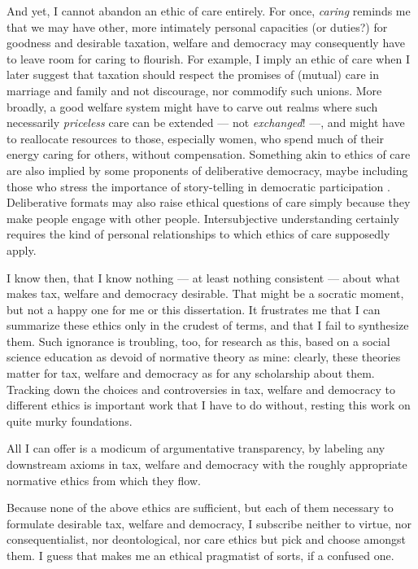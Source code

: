 \begin{description}
	And yet, I cannot abandon an ethic of care entirely. 
	For once, \emph{caring} reminds me that we may have other, more intimately personal capacities (or duties?) for goodness and desirable taxation, welfare and democracy may consequently have to leave room for caring to flourish. 
	For example, I imply an ethic of care when I later suggest that taxation should respect the promises of (mutual) care in marriage and family and not discourage, nor commodify such unions. %
	More broadly, a good welfare system might have to carve out realms where such necessarily \emph{priceless} care can be extended --- not \emph{exchanged}! ---, and might have to reallocate resources to those, especially women, who spend much of their energy caring for others, without compensation. 
	Something akin to ethics of care are also implied by some proponents of deliberative democracy, maybe including those who stress the importance of story-telling in democratic participation \citep{Poletta2006}. 
	Deliberative formats may also raise ethical questions of care simply because they make people engage with other people. Intersubjective understanding certainly requires the kind of personal relationships to which ethics of care supposedly apply.
\end{description}

I know then, that I know nothing --- at least nothing consistent --- about what makes tax, welfare and democracy desirable. 
That might be a socratic moment, but not a happy one for me or this dissertation. 
It frustrates me that I can summarize these ethics only in the crudest of terms, and that I fail to synthesize them. 
Such ignorance is troubling, too, for research as this, based on a social science education as devoid of normative theory as mine: clearly, these theories matter for tax, welfare and democracy as for any scholarship about them. 
Tracking down the choices and controversies in tax, welfare and democracy to different ethics is important work that I have to do without, resting this work on quite murky foundations.

All I can offer is a modicum of argumentative transparency, by labeling any downstream axioms in tax, welfare and democracy with the roughly appropriate normative ethics from which they flow.

Because none of the above ethics are sufficient, but each of them necessary to formulate desirable tax, welfare and democracy, I subscribe neither to virtue, nor consequentialist, nor deontological, nor care ethics but pick and choose amongst them.
I guess that makes me an ethical pragmatist of sorts, if a confused one.

